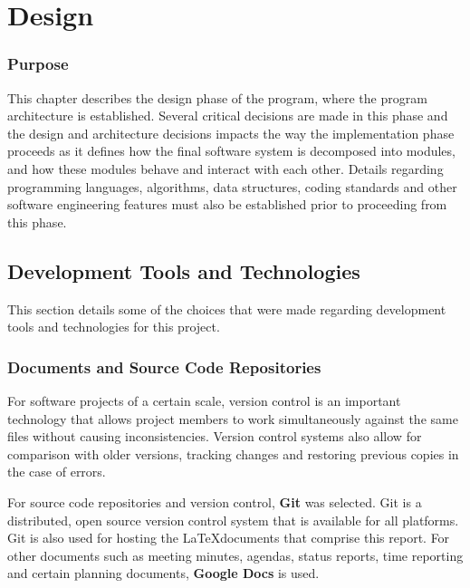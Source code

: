  

\chapter{Design}
\label{design}

\minitoc

\subsection*{Purpose}
This chapter describes the design phase of the program, where the program architecture is established. Several critical decisions are made in this phase and the design and architecture decisions impacts the way the implementation phase proceeds as it defines how the final software system is decomposed into modules, and how these modules behave and interact with each other. Details regarding programming languages, algorithms, data structures, coding standards and other software engineering features must also be established prior to proceeding from this phase.

\section{Development Tools and Technologies}\label{DevTools}
This section details some of the choices that were made regarding development tools and technologies for this project.

\subsection{Documents and Source Code Repositories}
For software projects of a certain scale, version control is an important technology that allows project members to work simultaneously against the same files without causing inconsistencies. Version control systems also allow for comparison with older versions, tracking changes and restoring previous copies in the case of errors.

For source code repositories and version control, \textbf{Git} was selected. Git is a distributed, open source version control system that is available for all platforms. Git is also used for hosting the \LaTeX documents that comprise this report. For other documents such as meeting minutes, agendas, status reports, time reporting and certain planning documents, \textbf{Google Docs} is used.

